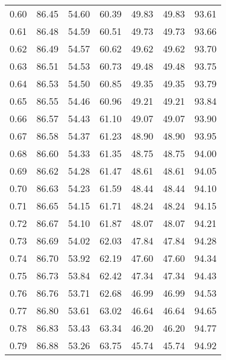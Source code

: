 \begin{tabular}{|c|c|c|c|c|c|c|}
      0.60 &     86.45 &     54.60 &      60.39 &   49.83 &      49.83 &         93.61 \\
      0.61 &     86.48 &     54.59 &      60.51 &   49.73 &      49.73 &         93.66 \\
      0.62 &     86.49 &     54.57 &      60.62 &   49.62 &      49.62 &         93.70 \\
      0.63 &     86.51 &     54.53 &      60.73 &   49.48 &      49.48 &         93.75 \\
      0.64 &     86.53 &     54.50 &      60.85 &   49.35 &      49.35 &         93.79 \\
      0.65 &     86.55 &     54.46 &      60.96 &   49.21 &      49.21 &         93.84 \\
      0.66 &     86.57 &     54.43 &      61.10 &   49.07 &      49.07 &         93.90 \\
      0.67 &     86.58 &     54.37 &      61.23 &   48.90 &      48.90 &         93.95 \\
      0.68 &     86.60 &     54.33 &      61.35 &   48.75 &      48.75 &         94.00 \\
      0.69 &     86.62 &     54.28 &      61.47 &   48.61 &      48.61 &         94.05 \\
      0.70 &     86.63 &     54.23 &      61.59 &   48.44 &      48.44 &         94.10 \\
      0.71 &     86.65 &     54.15 &      61.71 &   48.24 &      48.24 &         94.15 \\
      0.72 &     86.67 &     54.10 &      61.87 &   48.07 &      48.07 &         94.21 \\
      0.73 &     86.69 &     54.02 &      62.03 &   47.84 &      47.84 &         94.28 \\
      0.74 &     86.70 &     53.92 &      62.19 &   47.60 &      47.60 &         94.34 \\
      0.75 &     86.73 &     53.84 &      62.42 &   47.34 &      47.34 &         94.43 \\
      0.76 &     86.76 &     53.71 &      62.68 &   46.99 &      46.99 &         94.53 \\
      0.77 &     86.80 &     53.61 &      63.02 &   46.64 &      46.64 &         94.65 \\
      0.78 &     86.83 &     53.43 &      63.34 &   46.20 &      46.20 &         94.77 \\
      0.79 &     86.88 &     53.26 &      63.75 &   45.74 &      45.74 &         94.92 \\

\end{tabular}
